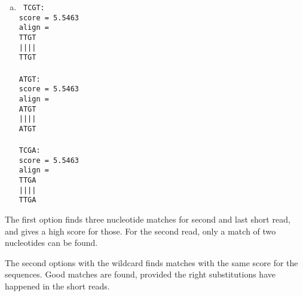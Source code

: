 \documentclass{article}
\begin{document}
\begin{spacing}{1.1}
{\begin{enumerate}[(a)]
   {\tt
     TCGT:\\
score = 3.3278\\
align =\\
TCGT\\
|:|:\\
TYGY\\
\\
ATGT:\\
score = 3.3278\\
align =\\
ATGT\\
|:|:\\
AYGY\\
\\
TCGA:\\
score = 3.3278\\
align =\\
TCGA\\
::||\\
YYGA\\
   }
 \item
   {\tt
     TCGT:\\
score = 5.5463\\
align =\\
TTGT\\
||||\\
TTGT\\
\\
ATGT:\\
score = 5.5463\\
align =\\
ATGT\\
||||\\
ATGT\\
\\
TCGA:\\
score = 5.5463\\
align =\\
TTGA\\
||||\\
TTGA\\
   }
   \end{enumerate}
   The first option finds three nucleotide matches for second and last short read, and gives a high score for those. For the second read, only a match of two nucleotides can be found.

   The second options with the wildcard finds matches with the same score for the sequences. Good matches are found, provided the right substitutions have happened in the short reads.

}
\end{spacing}
\end{document}
